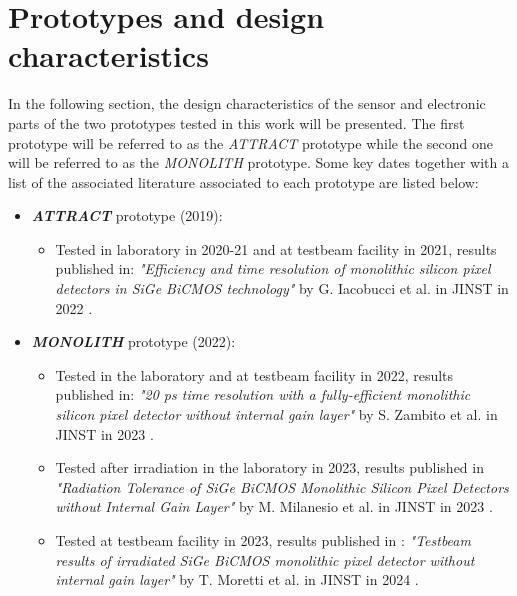 	\section{Prototypes and design characteristics}
	In the following section, the design characteristics of the sensor and electronic parts of the two prototypes tested in this work will be presented. The first prototype will be referred to as the \textit{ATTRACT} prototype while the second one will be referred to as the \textit{MONOLITH} prototype. Some key dates together with a list of the associated literature associated to each prototype are listed below: 
	\begin{itemize}
		\item \textbf{\textit{ATTRACT}} prototype (2019): 
		\begin{itemize}
			\item Tested in laboratory in 2020-21 and at testbeam facility in 2021, results published in: \textit{"Efficiency and time resolution of monolithic silicon pixel detectors in SiGe BiCMOS technology"} by G. Iacobucci et al. in JINST in 2022 \cite{ATTRACT_proto1_50ps}. 
		\end{itemize}
		\item \textbf{\textit{MONOLITH}} prototype (2022):
		\begin{itemize}
			\item Tested in the laboratory and at testbeam facility in 2022, results published in: \textit{"20 ps time resolution with a fully-efficient monolithic silicon pixel detector without internal gain layer"} by S. Zambito et al. in JINST in 2023 \cite{MONOLITH_proto2_20ps}.
			\item Tested after irradiation in the laboratory in 2023, results published in \textit{"Radiation Tolerance of SiGe BiCMOS Monolithic Silicon Pixel Detectors without Internal Gain Layer"} by M. Milanesio et al. in JINST in 2023 \cite{MONOLITH_RadHard_lab}.
			\item Tested at testbeam facility in 2023, results published in : \textit{"Testbeam results of irradiated SiGe BiCMOS monolithic pixel detector without internal gain layer"} by T. Moretti et al. in JINST in 2024 \cite{MONOLITH_RadHard_testbeam}.
		\end{itemize} 
	\end{itemize}

